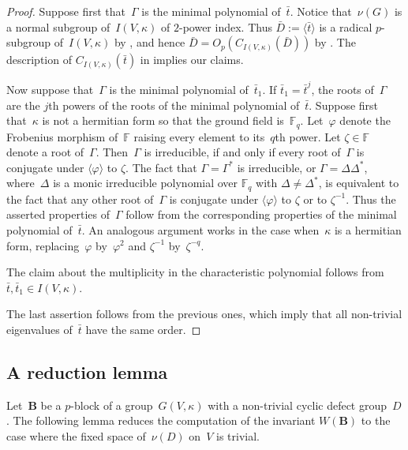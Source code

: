 \documentclass[12pt]{amsart}
\newcommand{\bB}{{\mathbf{B}}}
\theoremstyle{theorem}
\theoremstyle{definition}
\theoremstyle{remark}
\begin{document}
\begin{proof}
Suppose first that~$\Gamma$ is the minimal polynomial of~$\bar{t}$. Notice 
that~$\nu(G)$ is a normal subgroup of~$I(V,\kappa)$ of $2$-power index.
Thus $\bar{D} := \langle \bar{t} \rangle$ is a 
radical $p$-subgroup of~$I(V,\kappa)$ by \cite[Lemma~$2.2$(b)(c)]{HL24}, 
and hence $\bar{D} = O_p( C_{I(V,\kappa)}( \bar{D} ) )$ by 
\cite[Lemma~$2.1$]{HL24}. The description of $C_{I(V,\kappa)}( \bar{t} )$ in
\cite[Theorem~$6.1.2$]{FLO} implies our claims.

Now suppose that~$\Gamma$ is the minimal polynomial of~$\bar{t}_1$. If 
$\bar{t}_1 = \bar{t}^j$, the roots of~$\Gamma$ are the $j$th powers of the 
roots of the minimal polynomial of~$\bar{t}$. Suppose first that~$\kappa$ is 
not a hermitian form so that the ground field is~$\mathbb{F}_q$. Let~$\varphi$ 
denote the Frobenius morphism of~$\mathbb{F}$ raising every element to its~$q$th 
power. Let $\zeta \in \mathbb{F}$ denote a root of~$\Gamma$. Then~$\Gamma$ is 
irreducible, if and only if every root of~$\Gamma$ is conjugate under 
$\langle \varphi \rangle$ to $\zeta$. The fact that $\Gamma = \Gamma^*$ is 
irreducible, or $\Gamma = \Delta\Delta^*$, where~$\Delta$ is a monic irreducible 
polynomial over $\mathbb{F}_{q}$ with $\Delta \neq \Delta^*$, is equivalent to 
the fact that any other root of~$\Gamma$ is conjugate under 
$\langle \varphi \rangle$ 
to $\zeta$ or to $\zeta^{-1}$. Thus the asserted properties of~$\Gamma$ follow 
from the corresponding properties of the minimal polynomial of~$\bar{t}$.
An analogous argument works in the case when~$\kappa$ is a hermitian form, 
replacing~$\varphi$ by~$\varphi^2$ and $\zeta^{-1}$ by~$\zeta^{-q}$.

The claim about the multiplicity in the characteristic polynomial follows from 
$\bar{t}, \bar{t}_1 \in I(V,\kappa)$.

The last assertion follows from the previous ones, which imply that all 
non-trivial eigenvalues of~$\bar{t}$ have the same order.
\end{proof}

\subsection{A reduction lemma} Let~$\bB$ be a $p$-block of a group~$G(V,\kappa)$ 
with a non-trivial cyclic defect group~$D$. The following lemma reduces the
computation of the invariant $W(\bB)$ to the case where the fixed space 
of~$\nu(D)$ on~$V$ is trivial.
\end{document}
